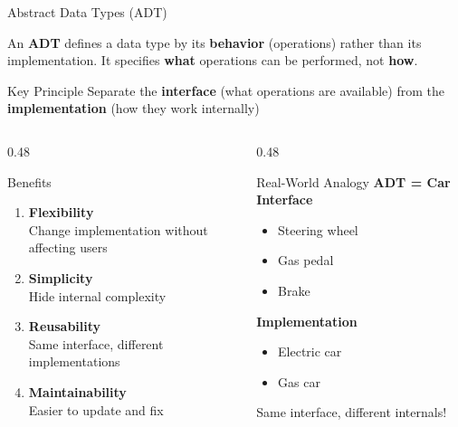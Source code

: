 \documentclass[aspectratio=169,xcolor=dvipsnames]{beamer}
\begin{document}
\begin{frame}{Abstract Data Types (ADT)}
  \begin{definition}
    An \textbf{ADT} defines a data type by its \textbf{behavior} (operations) rather than its implementation. It specifies \textbf{what} operations can be performed, not \textbf{how}.
  \end{definition}

  \vspace{0.5cm}

  \begin{block}{Key Principle}
    Separate the \textbf{interface} (what operations are available) from the \textbf{implementation} (how they work internally)
  \end{block}

  \vspace{0.3cm}

  \begin{columns}
    \begin{column}{0.48\textwidth}
      \begin{exampleblock}{Benefits}
        \begin{enumerate}
          \item \textbf{Flexibility} \\
                Change implementation without affecting users
          \item \textbf{Simplicity} \\
                Hide internal complexity
          \item \textbf{Reusability} \\
                Same interface, different implementations
          \item \textbf{Maintainability} \\
                Easier to update and fix
        \end{enumerate}
      \end{exampleblock}
    \end{column}
    \begin{column}{0.48\textwidth}
      \begin{exampleblock}{Real-World Analogy}
        \textbf{ADT = Car Interface}
        \begin{itemize}
          \item Steering wheel
          \item Gas pedal
          \item Brake
        \end{itemize}

        \textbf{Implementation}
        \begin{itemize}
          \item Electric car
          \item Gas car
        \end{itemize}

        Same interface, different internals!
      \end{exampleblock}
    \end{column}
  \end{columns}
\end{frame}
\end{document}
